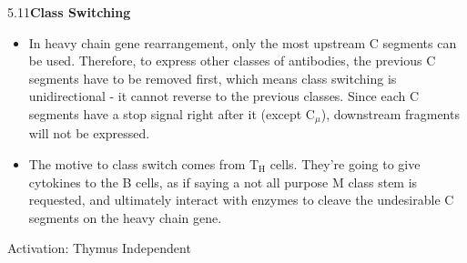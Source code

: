 \documentclass[UTF8]{book}
\begin{document}
5.11\quad \textbf{Class Switching}
\begin{itemize}
\item In heavy chain gene rearrangement, only the most upstream C segments can be used. Therefore, to express other classes of antibodies, the previous C segments have to be removed first, which means class switching is unidirectional - it cannot reverse to the previous classes. Since each C segments have a stop signal right after it (except C$_\mu$), downstream fragments will not be expressed.
\item The motive to class switch comes from T$_{\mathrm{H}}$ cells. They're going to give cytokines to the B cells, as if saying a not all purpose M class stem is requested, and ultimately interact with enzymes to cleave the undesirable C segments on the heavy chain gene.
\end{itemize} 
\quad Activation: Thymus Independent
\end{document}
